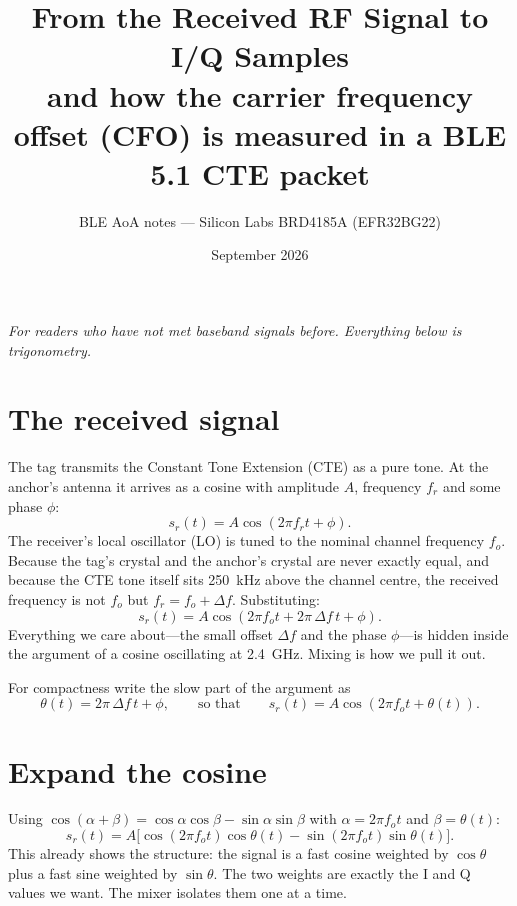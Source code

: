 \documentclass[11pt,a4paper]{article}
\title{From the Received RF Signal to I/Q Samples\\[4pt]\large and how the carrier frequency offset (CFO) is measured in a BLE 5.1 CTE packet}
\author{BLE AoA notes --- Silicon Labs BRD4185A (EFR32BG22)}
\date{September 2026}
\begin{document}
\maketitle

\noindent\emph{For readers who have not met baseband signals before. Everything below is trigonometry.}

\section{The received signal}
The tag transmits the Constant Tone Extension (CTE) as a pure tone. At the anchor's antenna it arrives as a cosine with amplitude $A$, frequency $f_r$ and some phase $\phi$:
\[
  s_r(t) = A\cos\!\left(2\pi f_r t + \phi\right).
\]
The receiver's local oscillator (LO) is tuned to the nominal channel frequency $f_o$. Because the tag's crystal and the anchor's crystal are never exactly equal, and because the CTE tone itself sits \SI{250}{kHz} above the channel centre, the received frequency is not $f_o$ but $f_r = f_o + \Delta f$. Substituting:
\[
  s_r(t) = A\cos\!\left(2\pi f_o t + 2\pi\,\Delta f\, t + \phi\right).
\]
Everything we care about---the small offset $\Delta f$ and the phase $\phi$---is hidden inside the argument of a cosine oscillating at \SI{2.4}{GHz}. Mixing is how we pull it out.

For compactness write the slow part of the argument as
\[
  \theta(t) = 2\pi\,\Delta f\, t + \phi ,
  \qquad\text{so that}\qquad
  s_r(t) = A\cos\!\left(2\pi f_o t + \theta(t)\right).
\]

\section{Expand the cosine}
Using $\cos(\alpha+\beta) = \cos\alpha\cos\beta - \sin\alpha\sin\beta$ with $\alpha = 2\pi f_o t$ and $\beta = \theta(t)$:
\[
  s_r(t) = A\Big[\cos(2\pi f_o t)\cos\theta(t) - \sin(2\pi f_o t)\sin\theta(t)\Big].
\]
This already shows the structure: the signal is a fast cosine weighted by $\cos\theta$ plus a fast sine weighted by $\sin\theta$. The two weights are exactly the I and Q values we want. The mixer isolates them one at a time.
\end{document}

